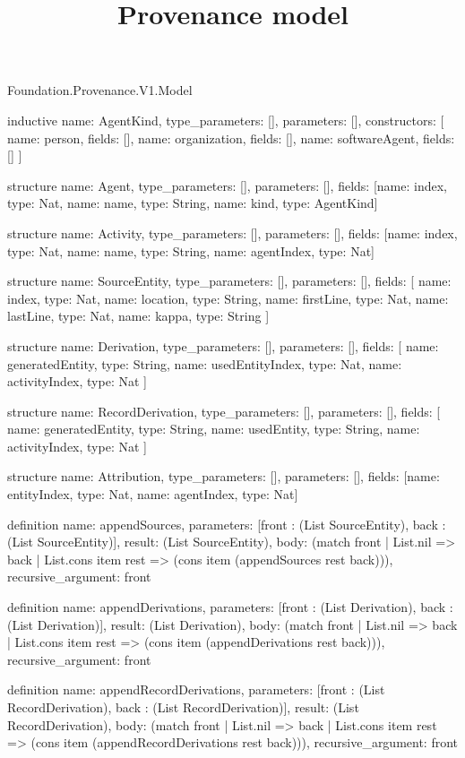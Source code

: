 \begin{lexlean}{Foundation.Provenance.V1.Model}
\title{Provenance model}
\begin{semanticmodule}
inductive{
  name: AgentKind,
  type_parameters: [],
  parameters: [],
  constructors: [
    {name: person, fields: []},
    {name: organization, fields: []},
    {name: softwareAgent, fields: []}
  ]
}

structure{
  name: Agent,
  type_parameters: [],
  parameters: [],
  fields: [{name: index, type: Nat}, {name: name, type: String}, {name: kind, type: AgentKind}]
}

structure{
  name: Activity,
  type_parameters: [],
  parameters: [],
  fields: [{name: index, type: Nat}, {name: name, type: String}, {name: agentIndex, type: Nat}]
}

structure{
  name: SourceEntity,
  type_parameters: [],
  parameters: [],
  fields: [
    {name: index, type: Nat},
    {name: location, type: String},
    {name: firstLine, type: Nat},
    {name: lastLine, type: Nat},
    {name: kappa, type: String}
  ]
}

structure{
  name: Derivation,
  type_parameters: [],
  parameters: [],
  fields: [
    {name: generatedEntity, type: String},
    {name: usedEntityIndex, type: Nat},
    {name: activityIndex, type: Nat}
  ]
}

structure{
  name: RecordDerivation,
  type_parameters: [],
  parameters: [],
  fields: [
    {name: generatedEntity, type: String},
    {name: usedEntity, type: String},
    {name: activityIndex, type: Nat}
  ]
}

structure{
  name: Attribution,
  type_parameters: [],
  parameters: [],
  fields: [{name: entityIndex, type: Nat}, {name: agentIndex, type: Nat}]
}

definition{
  name: appendSources,
  parameters: [front : (List SourceEntity), back : (List SourceEntity)],
  result: (List SourceEntity),
  body: (match front
    | List.nil => back
    | List.cons item rest => (cons item (appendSources rest back))),
  recursive_argument: front
}

definition{
  name: appendDerivations,
  parameters: [front : (List Derivation), back : (List Derivation)],
  result: (List Derivation),
  body: (match front
    | List.nil => back
    | List.cons item rest => (cons item (appendDerivations rest back))),
  recursive_argument: front
}

definition{
  name: appendRecordDerivations,
  parameters: [front : (List RecordDerivation), back : (List RecordDerivation)],
  result: (List RecordDerivation),
  body: (match front
    | List.nil => back
    | List.cons item rest => (cons item (appendRecordDerivations rest back))),
  recursive_argument: front
}


\end{semanticmodule}
\end{lexlean}
